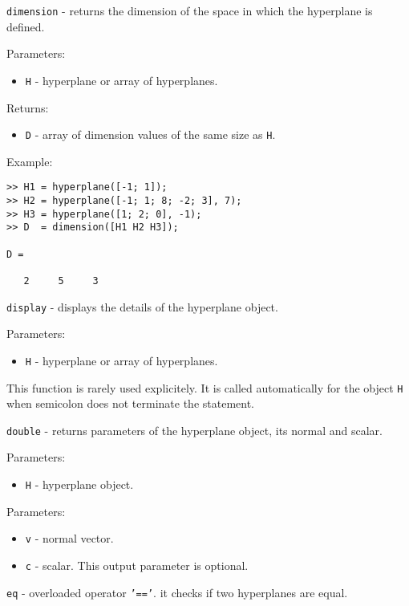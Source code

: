 \newpage

{\Large {\tt dimension}} - returns the dimension of the space in which
the hyperplane is defined.

Parameters:
\begin{itemize}
\item {\tt H} - hyperplane or array of hyperplanes.
\end{itemize}

Returns:
\begin{itemize}
\item {\tt D} - array of dimension values of the same size as {\tt H}.
\end{itemize}

Example:
{\tt \begin{verbatim}
>> H1 = hyperplane([-1; 1]);
>> H2 = hyperplane([-1; 1; 8; -2; 3], 7);
>> H3 = hyperplane([1; 2; 0], -1);
>> D  = dimension([H1 H2 H3]);

D =

   2     5     3
\end{verbatim} }

\newpage

{\Large {\tt display}} - displays the details of the hyperplane object.

Parameters:
\begin{itemize}
\item {\tt H} - hyperplane or array of hyperplanes.
\end{itemize}
This function is rarely used explicitely. It is called automatically
for the object {\tt H} when semicolon does not terminate the statement.

\newpage

{\Large {\tt double}} - returns parameters of the hyperplane object,
its normal and scalar.

Parameters:
\begin{itemize}
\item {\tt H} - hyperplane object.
\end{itemize}

Parameters:
\begin{itemize}
\item {\tt v} - normal vector.
\item {\tt c} - scalar. This output parameter is optional.
\end{itemize}

\newpage

{\Large {\tt eq}} - overloaded operator {\tt '=='}.
it checks if two hyperplanes are equal.

